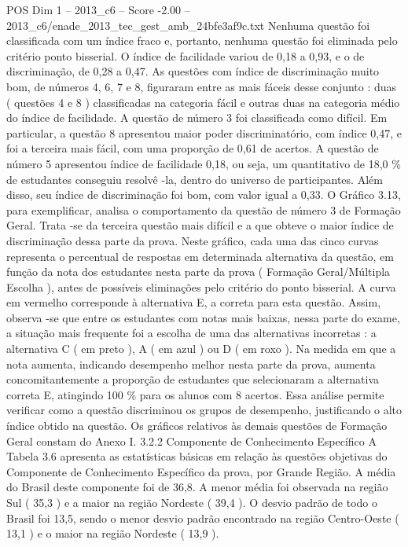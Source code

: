 \begin{textsample}{POS Dim 1 – 2013\_c6 – Score -2.00 – 2013\_c6/enade\_2013\_tec\_gest\_amb\_24bfe3af9c.txt}
Nenhuma questão foi classificada com um índice fraco e, portanto, nenhuma questão foi eliminada pelo critério ponto bisserial.
O índice de facilidade variou de 0,18 a 0,93, e o de discriminação, de 0,28 a 0,47.
As questões com índice de discriminação muito bom, de números 4, 6, 7 e 8, figuraram entre as mais fáceis desse conjunto : duas ( questões 4 e 8 ) classificadas na categoria fácil e outras duas na categoria médio do índice de facilidade.
A questão de número 3 foi classificada como difícil.
Em particular, a questão 8 apresentou maior poder discriminatório, com índice 0,47, e foi a terceira mais fácil, com uma proporção de 0,61 de acertos.
A questão de número 5 apresentou índice de facilidade 0,18, ou seja, um quantitativo de 18,0 \% de estudantes conseguiu resolvê -la, dentro do universo de participantes.
Além disso, seu índice de discriminação foi bom, com valor igual a 0,33.
O Gráfico 3.13, para exemplificar, analisa o comportamento da questão de número 3 de Formação Geral.
Trata -se da terceira questão mais difícil e a que obteve o maior índice de discriminação dessa parte da prova.
Neste gráfico, cada uma das cinco curvas representa o percentual de respostas em determinada alternativa da questão, em função da nota dos estudantes nesta parte da prova ( Formação Geral/Múltipla Escolha ), antes de possíveis eliminações pelo critério do ponto bisserial.
A curva em vermelho corresponde à alternativa E, a correta para esta questão.
Assim, observa -se que entre os estudantes com notas mais baixas, nessa parte do exame, a situação mais frequente foi a escolha de uma das alternativas incorretas : a alternativa C ( em preto ), A ( em azul ) ou D ( em roxo ).
Na medida em que a nota aumenta, indicando desempenho melhor nesta parte da prova, aumenta concomitantemente a proporção de estudantes que selecionaram a alternativa correta E, atingindo 100 \% para os alunos com 8 acertos.
Essa análise permite verificar como a questão discriminou os grupos de desempenho, justificando o alto índice obtido na questão.
Os gráficos relativos às demais questões de Formação Geral constam do Anexo I. 3.2.2 Componente de Conhecimento Específico A Tabela 3.6 apresenta as estatísticas básicas em relação às questões objetivas do Componente de Conhecimento Específico da prova, por Grande Região.
A média do Brasil deste componente foi de 36,8.
A menor média foi observada na região Sul ( 35,3 ) e a maior na região Nordeste ( 39,4 ).
O desvio padrão de todo o Brasil foi 13,5, sendo o menor desvio padrão encontrado na região Centro-Oeste ( 13,1 ) e o maior na região Nordeste ( 13,9 ).

\end{textsample}
